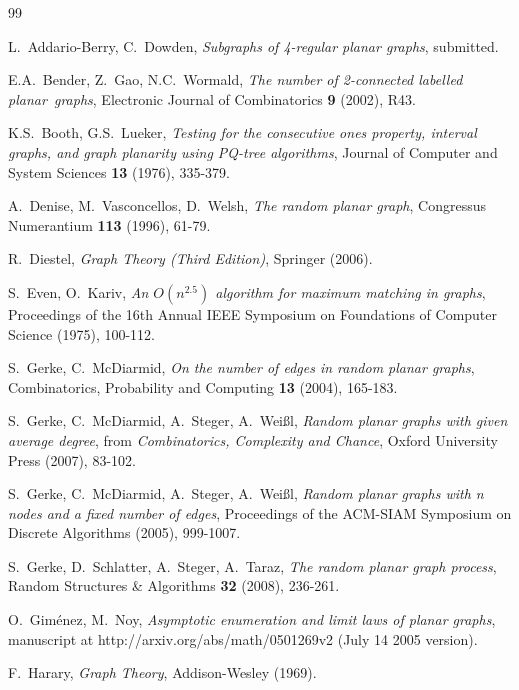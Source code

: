 \documentclass{article}
\newtheorem{Proof of Theorem}{Proof of Theorem}
\begin{document}
\newpage
\begin{thebibliography}{99}





 L.~Addario-Berry, C.~Dowden,
\textit{Subgraphs of 4-regular planar graphs},
submitted.

 E.A.~Bender, Z.~Gao, N.C.~Wormald, 
\textit{The number of 2-connected labelled \mbox{planar graphs}}, 
Electronic Journal of Combinatorics \textbf{9} (2002), R43.

 K.S.~Booth, G.S.~Lueker,
\textit{Testing for the consecutive ones property, interval graphs, and graph planarity using PQ-tree algorithms},
Journal of Computer and System Sciences \textbf{13} (1976), 335-379.

 A.~Denise, M.~Vasconcellos, D.~Welsh, 
\textit{The random planar graph}, 
Congressus Numerantium \textbf{113} (1996), 61-79. 

 R.~Diestel, 
\textit{Graph Theory (Third Edition)},
Springer (2006).

 S.~Even, O.~Kariv,
\textit{An $O \left( n^{2.5} \right)$ algorithm for maximum matching in graphs},
Proceedings of the 16th Annual IEEE Symposium on Foundations of Computer Science (1975), 100-112.

 S.~Gerke, C.~McDiarmid, 
\textit{On the number of edges in random planar graphs}, 
Combinatorics, Probability and Computing \textbf{13} (2004), 165-183.

 S.~Gerke, C.~McDiarmid, A.~Steger, A.~Wei\ss l, 
\textit{Random planar graphs with given average degree},
from \textit{Combinatorics, Complexity and Chance},
Oxford University Press (2007), 83-102.

 S.~Gerke, C.~McDiarmid, A.~Steger, A.~Wei\ss l, 
\textit{Random planar graphs with n nodes and a fixed number of edges}, 
Proceedings of the ACM-SIAM Symposium on Discrete Algorithms (2005), 999-1007.

 S.~Gerke, D.~Schlatter, A.~Steger, A.~Taraz, 
\textit{The random planar graph process}, 
Random Structures \& Algorithms \textbf{32} (2008), 236-261.

 O.~Gim\'enez, M.~Noy, 
\textit{Asymptotic enumeration and limit laws of planar graphs}, 
manuscript at http://arxiv.org/abs/math/0501269v2 (July 14 2005 version).

 F.~Harary,
\textit{Graph Theory},
Addison-Wesley (1969).


\end{thebibliography}
\end{document}
